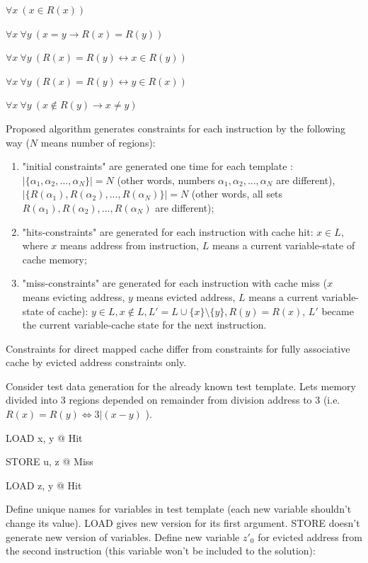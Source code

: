 $\forall x~( x \in R(x) )$

$\forall x~\forall y~( x = y \rightarrow R(x) = R(y) )$

$\forall x~\forall y~( R(x) = R(y) \leftrightarrow x \in R(y) )$

$\forall x~\forall y~( R(x) = R(y) \leftrightarrow y \in R(x) )$

$\forall x~\forall y~( x \notin R(y) \rightarrow x \neq y )$

Proposed algorithm generates constraints for each instruction by the
following way ($N$ means number of regions):
\begin{enumerate}
\item "initial constraints" are generated one time for each template :
$|\{ \alpha_1, \alpha_2,..., \alpha_N\}| = N$ (other words, numbers
$\alpha_1, \alpha_2,..., \alpha_N$ are different), $|\{ R(\alpha_1),
R(\alpha_2),..., R(\alpha_N)\}| = N$ (other words, all sets
$R(\alpha_1), R(\alpha_2),..., R(\alpha_N)$ are different);
\item "hits-constraints" are generated for each instruction
with cache hit: $x \in L$, where $x$ means address from instruction,
$L$ means a current variable-state of cache memory;
\item "miss-constraints" are generated for each instruction with
cache miss ($x$ means evicting address, $y$ means evicted address,
$L$ means a current variable-state of cache): $y \in L, x \notin L,
L' = L \cup \{x\} \setminus \{y\}, R(y) = R(x)$, $L'$ became the
current variable-cache state for the next instruction.
\end{enumerate}

Constraints for direct mapped cache differ from constraints for
fully associative cache by evicted address constraints only.

Consider test data generation for the already known test template.
Lets memory divided into 3 regions depended on remainder from
division address to 3 (i.e. $R(x) = R(y) \Leftrightarrow 3 | (x-y)$
).

LOAD x, y @ Hit

STORE u, z @ Miss

LOAD z, y @ Hit

Define unique names for variables in test template (each new
variable shouldn't change its value). LOAD gives new version for its
first argument. STORE doesn't generate new version of variables.
Define new variable $z'_0$ for evicted address from the second
instruction (this variable won't be included to the solution):

